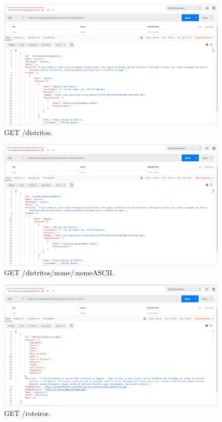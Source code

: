 \begin{figure}[H]
\centering
\includegraphics[width=\linewidth]{images/api_distritos.png}
\caption{GET /distritos.}
\end{figure}

\begin{figure}[H]
\centering
\includegraphics[width=\linewidth]{images/api_distritos.png}
\caption{GET /distritos/nome/:nomeASCII.}
\end{figure}

\begin{figure}[H]
\centering
\includegraphics[width=\linewidth]{images/api_roteiro.png}
\caption{GET /roteiros.}
\end{figure}

